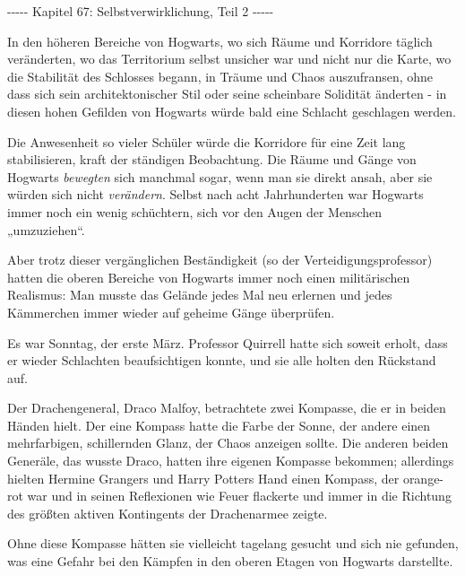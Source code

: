 

\hypertarget{selbstverwirklichung-teil-2}{%

-\/-\/-\/-\/- Kapitel 67: Selbstverwirklichung, Teil 2 -\/-\/-\/-\/-

In den höheren Bereiche von Hogwarts, wo sich Räume und Korridore täglich veränderten, wo das Territorium selbst unsicher war und nicht nur die Karte, wo die Stabilität des Schlosses begann, in Träume und Chaos auszufransen, ohne dass sich sein architektonischer Stil oder seine scheinbare Solidität änderten - in diesen hohen Gefilden von Hogwarts würde bald eine Schlacht geschlagen werden.

Die Anwesenheit so vieler Schüler würde die Korridore für eine Zeit lang stabilisieren, kraft der ständigen Beobachtung. Die Räume und Gänge von Hogwarts \emph{bewegten} sich manchmal sogar, wenn man sie direkt ansah, aber sie würden sich nicht \emph{verändern}. Selbst nach acht Jahrhunderten war Hogwarts immer noch ein wenig schüchtern, sich vor den Augen der Menschen „umzuziehen“.

Aber trotz dieser vergänglichen Beständigkeit (so der Verteidigungsprofessor) hatten die oberen Bereiche von Hogwarts immer noch einen militärischen Realismus: Man musste das Gelände jedes Mal neu erlernen und jedes Kämmerchen immer wieder auf geheime Gänge überprüfen.

Es war Sonntag, der erste März. Professor Quirrell hatte sich soweit erholt, dass er wieder Schlachten beaufsichtigen konnte, und sie alle holten den Rückstand auf.

Der Drachengeneral, Draco Malfoy, betrachtete zwei Kompasse, die er in beiden Händen hielt. Der eine Kompass hatte die Farbe der Sonne, der andere einen mehrfarbigen, schillernden Glanz, der Chaos anzeigen sollte. Die anderen beiden Generäle, das wusste Draco, hatten ihre eigenen Kompasse bekommen; allerdings hielten Hermine Grangers und Harry Potters Hand einen Kompass, der orange-rot war und in seinen Reflexionen wie Feuer flackerte und immer in die Richtung des größten aktiven Kontingents der Drachenarmee zeigte.

Ohne diese Kompasse hätten sie vielleicht tagelang gesucht und sich nie gefunden, was eine Gefahr bei den Kämpfen in den oberen Etagen von Hogwarts darstellte.

}
